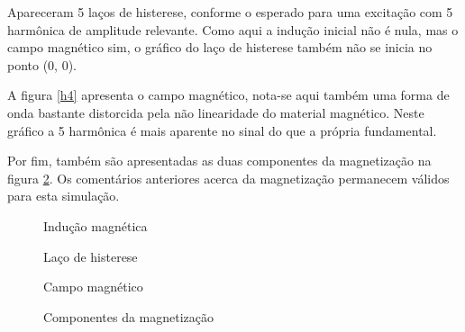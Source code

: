 \documentclass{homeworg}
\begin{document}
\hspace{1cm} Apareceram 5 laços de histerese, conforme o esperado para uma excitação com {5\textordfeminine} harmônica de amplitude relevante. Como aqui a indução inicial não é nula, mas o campo magnético sim, o gráfico do laço de histerese também não se inicia no ponto (0, 0).

\hspace{1cm} A figura \ref{h4} apresenta o campo magnético, nota-se aqui também uma forma de onda bastante distorcida pela não linearidade do material magnético. Neste gráfico a {5\textordfeminine} harmônica é mais aparente no sinal do que a própria fundamental.

\hspace{1cm} Por fim, também são apresentadas as duas componentes da magnetização na figura \ref{c4}. Os comentários anteriores acerca da magnetização permanecem válidos para esta simulação.

\begin{figure}[!h]
  \begin{minipage}{.49\linewidth}
    \centering
    
    \vspace{-.5cm}
    \caption{Indução magnética}
    \label{b4}
  \end{minipage}%
  \begin{minipage}{.49\linewidth}
    \centering
    
    \vspace{-.5cm}
    \caption{Laço de histerese}
    \label{l4}
  \end{minipage}
\end{figure}
\begin{figure}[!h]
  \begin{minipage}{.49\linewidth}
    \centering
    
    \vspace{-.5cm}
    \caption{Campo magnético}
    \label{h4}
  \end{minipage}%
  \begin{minipage}{.49\linewidth}
    \centering
    
    \vspace{-.5cm}
    \caption{Componentes da magnetização}
    \label{c4}
  \end{minipage}
\end{figure}

\newpage

\printbibliography

\end{document}
